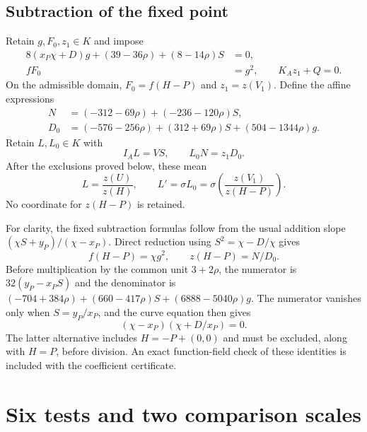 \documentclass[11pt,a4paper]{article}
\begin{document}
\subsection{Subtraction of the fixed point}

Retain $g,F_0,z_1\in K$ and impose
\begin{equation}\label{eq:fixedsubtract}
 \begin{split}
 8(x_P\chi+D)g+(39-36\rho)+(8-14\rho)S&=0,\\
 fF_0&=g^2,\qquad K_Az_1+Q=0.
 \end{split}
\end{equation}
On the admissible domain, $F_0=f(H-P)$ and $z_1=z(V_1)$.
Define the affine expressions
\begin{equation}\label{eq:ND}
 \begin{split}
 N&=(-312-69\rho)+(-236-120\rho)S,\\
 D_0&=(-576-256\rho)+(312+69\rho)S+(504-1344\rho)g.
 \end{split}
\end{equation}
Retain $L,L_0\in K$ with
\begin{equation}\label{eq:ratios}
                         I_AL=VS,\qquad L_0N=z_1D_0.
\end{equation}
After the exclusions proved below, these mean
\[
 L=\frac{z(U)}{z(H)},\qquad
 L'=\sigma L_0=\sigma\!\left(\frac{z(V_1)}{z(H-P)}\right).
\]
No coordinate for $z(H-P)$ is retained.

For clarity, the fixed subtraction formulas follow from the usual
addition slope $(\chi S+y_P)/(\chi-x_P)$.
Direct reduction using $S^2=\chi-D/\chi$ gives
\[
 f(H-P)=\chi g^2,\qquad z(H-P)=N/D_0.
\]
Before multiplication by the common unit $3+2\rho$, the numerator
is $32(y_P-x_PS)$ and the denominator is
$(-704+384\rho)+(660-417\rho)S+(6888-5040\rho)g$.
The numerator vanishes only when
$S=y_P/x_P$, and the curve equation then gives
\[
                    (\chi-x_P)(\chi+D/x_P)=0.
\]
The latter alternative includes $H=-P+(0,0)$ and must be excluded,
along with $H=P$, before division. An exact function-field check of
these identities is included with the coefficient certificate.

\section{Six tests and two comparison scales}
\end{document}
